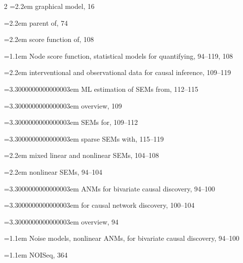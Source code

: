 \begin{multicols}{2}
\noindent\hangindent=2.2em \hspace*{1.1em}graphical model, 16\par
\noindent\hangindent=2.2em \hspace*{1.1em}parent of, 74\par
\noindent\hangindent=2.2em \hspace*{1.1em}score function of, 108\par
\noindent\hangindent=1.1em Node score function, statistical models for quantifying, 94--119, 108\par
\noindent\hangindent=2.2em \hspace*{1.1em}interventional and observational data for causal inference, 109--119\par
\noindent\hangindent=3.3000000000000003em \hspace*{2.2em}ML estimation of SEMs from, 112--115\par
\noindent\hangindent=3.3000000000000003em \hspace*{2.2em}overview, 109\par
\noindent\hangindent=3.3000000000000003em \hspace*{2.2em}SEMs for, 109--112\par
\noindent\hangindent=3.3000000000000003em \hspace*{2.2em}sparse SEMs with, 115--119\par
\noindent\hangindent=2.2em \hspace*{1.1em}mixed linear and nonlinear SEMs, 104--108\par
\noindent\hangindent=2.2em \hspace*{1.1em}nonlinear SEMs, 94--104\par
\noindent\hangindent=3.3000000000000003em \hspace*{2.2em}ANMs for bivariate causal discovery, 94--100\par
\noindent\hangindent=3.3000000000000003em \hspace*{2.2em}for causal network discovery, 100--104\par
\noindent\hangindent=3.3000000000000003em \hspace*{2.2em}overview, 94\par
\noindent\hangindent=1.1em Noise models, nonlinear ANMs, for bivariate causal discovery, 94--100\par
\noindent\hangindent=1.1em NOISeq, 364\par

\end{multicols}
